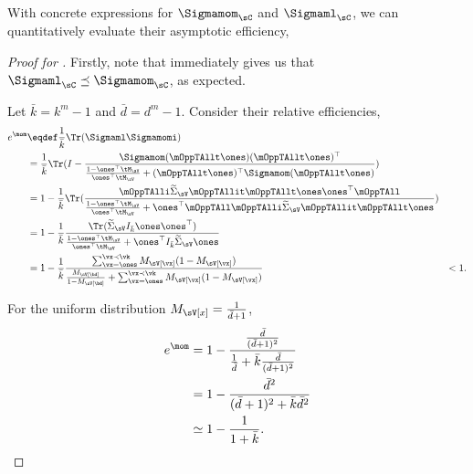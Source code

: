 With concrete expressions for $\Sigmamom_\sC$ and $\Sigmaml_\sC$, we can quantitatively evaluate their asymptotic efficiency,
\begin{proof}[Proof for ]
  Firstly, note that  immediately gives us that
  ${\Sigmaml_\sC} \preceq {\Sigmamom_\sC}$, as expected.

  Let $\bar k = k^m -1$ and $\bar d = d^m -1$. Consider their relative
  efficiencies, 
  \begin{align*}
    e^\mom 
        &\eqdef \frac{1}{\bar k} \Tr(\Sigmaml\Sigmamomi ) \\
        &= \frac{1}{\bar k} \Tr( I -  \frac{\Sigmamom (\mOppTAllt \ones)(\mOppTAllt \ones)^\top}{\frac{1 - \ones^\top \tM_\sV}{\ones^\top \tM_\sV} + (\mOppTAllt \ones)^\top \Sigmamom (\mOppTAllt \ones)} ) \\
        &= 1 - \frac{1}{\bar k} \Tr( \frac{\mOppTAlli \widetilde\Sigma_\sV \mOppTAllit \mOppTAllt \ones \ones^\top \mOppTAll }{\frac{1 - \ones^\top \tM_\sV}{\ones^\top \tM_\sV} + \ones^\top \mOppTAll \mOppTAlli \widetilde\Sigma_\sV \mOppTAllit \mOppTAllt \ones} ) \\
        &= 1 - \frac{1}{\bar k} \frac{\Tr( \widetilde\Sigma_\sV I_{\bar k} \ones \ones^\top )}{\frac{1 - \ones^\top \tM_\sV}{\ones^\top \tM_\sV} + \ones^\top I_{\bar k} \widetilde\Sigma_\sV \ones} \\
        &= 1 - \frac{1}{\bar k} 
        \frac{\sum_{\vx = \ones}^{\vx \prec \vk} M_\sV[\vx] (1 - M_\sV[\vx])}
        {\frac{M_\sV[\bd]}{1 - M_\sV[\bd]} + \sum_{\vx = \ones}^{\vx \prec \vk} M_\sV[\vx] (1 - M_\sV[\vx])}
        &< 1.
  \end{align*}

  For the uniform distribution $M_\sV[x] = \frac{1}{\bar d + 1}$,
  \begin{align*}
    e^\mom 
    &= 1 - \frac{\frac{\bar d}{(\bar d + 1)^2}}{ \frac{1}{\bar d} + {\bar k} \frac{\bar d}{(\bar d + 1)^2}} \\
    &= 1 - \frac{{\bar d}^2}{ (\bar d + 1)^2 + \bar{k} {\bar d}^2} \\
    &\simeq 1 - \frac{1}{1 + \bar k}.
  \end{align*}
   
\end{proof}

